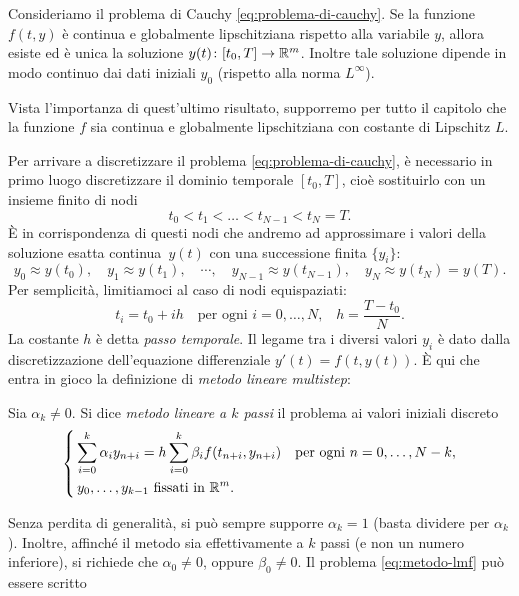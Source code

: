 \begin{teor}
Consideriamo il problema di Cauchy \eqref{eq:problema-di-cauchy}.
Se la funzione $f(t,y)$ è continua e globalmente lipschitziana rispetto
alla variabile $y$, allora esiste ed è unica la soluzione
$y(t) \colon [t_0,T] \to \mathbb{R}^m$.
Inoltre tale soluzione dipende in modo continuo
dai dati iniziali $y_0$ (rispetto alla norma $L^\infty$).
\end{teor}

\noindent Vista l'importanza di quest'ultimo risultato, supporremo per tutto
il capitolo che la funzione $f$ sia continua e globalmente lipschitziana
con costante di Lipschitz $L$.

Per arrivare a discretizzare il problema \eqref{eq:problema-di-cauchy},
è necessario in primo luogo discretizzare il dominio temporale $[t_0,T]$,
cioè sostituirlo con un insieme finito di nodi
\[
t_0 < t_1 < \ldots < t_{N-1} < t_N = T.
\]
È in corrispondenza di questi nodi che andremo ad approssimare
i valori della soluzione esatta continua~$y(t)$ con una successione finita $\{y_i\}$:
\[
y_0 \approx y(t_0),
\quad y_1 \approx y(t_1),
\quad \cdots,
\quad y_{N-1} \approx y(t_{N-1}),
\quad y_N \approx y(t_N) = y(T).
\]
Per semplicità, limitiamoci al caso di nodi equispaziati:
\[
t_i = t_0 + ih
\quad \text{per ogni $i = 0,\dots,N$,} \quad h = \frac{T-t_0}{N}.
\]
La costante $h$ è detta \emph{passo temporale}.
Il legame tra i diversi valori $y_i$ è dato dalla
discretizzazione dell'equazione differenziale $y'(t) = f(t,y(t))$.
È qui che entra in gioco la definizione di \emph{metodo lineare multistep}:
\begin{defi}
Sia $\alpha_k \neq 0$. Si dice \emph{metodo lineare a $k$ passi}
il problema ai valori iniziali discreto
\begin{equation}\label{eq:metodo-lmf}
\left\{
\begin{aligned}
& \sum_{i=0}^k \alpha_i y_{n+i} = h \sum_{i=0}^k \beta_i f(t_{n+i},y_{n+i})
\quad \text{per ogni $n=0,\dots,N-k$}, \\
& \, \text{$y_0,\dots,y_{k-1}$ fissati in $\mathbb{R}^m$}.
\end{aligned}
\right.
\end{equation}
\end{defi}
\noindent Senza perdita di generalità, si può sempre supporre $\alpha_k = 1$
(basta dividere per $\alpha_k$). Inoltre, affinché il metodo sia effettivamente
a $k$ passi (e non un numero inferiore), si richiede che $\alpha_0 \neq 0$,
oppure $\beta_0 \neq 0$. Il problema \eqref{eq:metodo-lmf} può essere scritto
